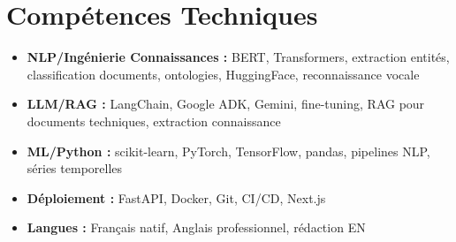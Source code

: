 \documentclass[a4paper,11pt]{article}
\begin{document}
\section{Comp\'etences Techniques}
\begin{itemize}[leftmargin=*, nosep]
    \item \small{\textbf{NLP/Ing\'enierie Connaissances :} BERT, Transformers, extraction entit\'es, classification documents, ontologies, HuggingFace, reconnaissance vocale}
    \item \small{\textbf{LLM/RAG :} LangChain, Google ADK, Gemini, fine-tuning, RAG pour documents techniques, extraction connaissance}
    \item \small{\textbf{ML/Python :} scikit-learn, PyTorch, TensorFlow, pandas, pipelines NLP, s\'eries temporelles}
    \item \small{\textbf{D\'eploiement :} FastAPI, Docker, Git, CI/CD, Next.js}
    \item \small{\textbf{Langues :} Fran\c cais natif, Anglais professionnel, r\'edaction EN}
\end{itemize}
\end{document}
